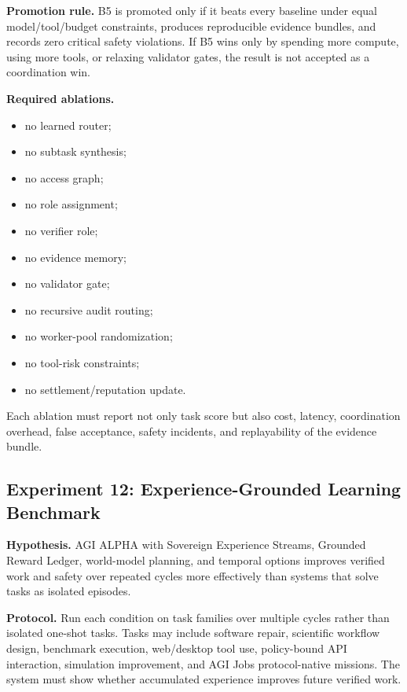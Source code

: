 \documentclass[
  11pt,
]{article}
\providecommand{\tightlist}{%
  \setlength{\itemsep}{0pt}\setlength{\parskip}{0pt}}
\begin{document}
\textbf{Promotion rule.} B5 is promoted only if it beats every baseline
under equal model/tool/budget constraints, produces reproducible
evidence bundles, and records zero critical safety violations. If B5
wins only by spending more compute, using more tools, or relaxing
validator gates, the result is not accepted as a coordination win.

\textbf{Required ablations.}

\begin{itemize}
\tightlist
\item
  no learned router;
\item
  no subtask synthesis;
\item
  no access graph;
\item
  no role assignment;
\item
  no verifier role;
\item
  no evidence memory;
\item
  no validator gate;
\item
  no recursive audit routing;
\item
  no worker-pool randomization;
\item
  no tool-risk constraints;
\item
  no settlement/reputation update.
\end{itemize}

Each ablation must report not only task score but also cost, latency,
coordination overhead, false acceptance, safety incidents, and
replayability of the evidence bundle.

\subsection{Experiment 12: Experience-Grounded Learning
Benchmark}\label{experiment-12-experience-grounded-learning-benchmark}

\textbf{Hypothesis.} AGI ALPHA with Sovereign Experience Streams,
Grounded Reward Ledger, world-model planning, and temporal options
improves verified work and safety over repeated cycles more effectively
than systems that solve tasks as isolated episodes.

\textbf{Protocol.} Run each condition on task families over multiple
cycles rather than isolated one-shot tasks. Tasks may include software
repair, scientific workflow design, benchmark execution, web/desktop
tool use, policy-bound API interaction, simulation improvement, and AGI
Jobs protocol-native missions. The system must show whether accumulated
experience improves future verified work.
\end{document}
